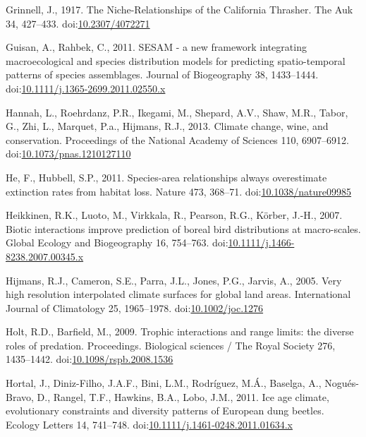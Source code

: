 \hypertarget{ref-Grinnell1917a}{}
Grinnell, J., 1917. The Niche-Relationships of the California Thrasher.
The Auk 34, 427--433.
doi:\href{https://doi.org/10.2307/4072271}{10.2307/4072271}

\hypertarget{ref-Guisan2011}{}
Guisan, A., Rahbek, C., 2011. SESAM - a new framework integrating
macroecological and species distribution models for predicting
spatio-temporal patterns of species assemblages. Journal of Biogeography
38, 1433--1444.
doi:\href{https://doi.org/10.1111/j.1365-2699.2011.02550.x}{10.1111/j.1365-2699.2011.02550.x}

\hypertarget{ref-Hannah2013}{}
Hannah, L., Roehrdanz, P.R., Ikegami, M., Shepard, A.V., Shaw, M.R.,
Tabor, G., Zhi, L., Marquet, P.a., Hijmans, R.J., 2013. Climate change,
wine, and conservation. Proceedings of the National Academy of Sciences
110, 6907--6912.
doi:\href{https://doi.org/10.1073/pnas.1210127110}{10.1073/pnas.1210127110}

\hypertarget{ref-He2011}{}
He, F., Hubbell, S.P., 2011. Species-area relationships always
overestimate extinction rates from habitat loss. Nature 473, 368--71.
doi:\href{https://doi.org/10.1038/nature09985}{10.1038/nature09985}

\hypertarget{ref-Heikkinen2007}{}
Heikkinen, R.K., Luoto, M., Virkkala, R., Pearson, R.G., Körber, J.-H.,
2007. Biotic interactions improve prediction of boreal bird
distributions at macro-scales. Global Ecology and Biogeography 16,
754--763.
doi:\href{https://doi.org/10.1111/j.1466-8238.2007.00345.x}{10.1111/j.1466-8238.2007.00345.x}

\hypertarget{ref-Hijmans2005}{}
Hijmans, R.J., Cameron, S.E., Parra, J.L., Jones, P.G., Jarvis, A.,
2005. Very high resolution interpolated climate surfaces for global land
areas. International Journal of Climatology 25, 1965--1978.
doi:\href{https://doi.org/10.1002/joc.1276}{10.1002/joc.1276}

\hypertarget{ref-Holt2009}{}
Holt, R.D., Barfield, M., 2009. Trophic interactions and range limits:
the diverse roles of predation. Proceedings. Biological sciences / The
Royal Society 276, 1435--1442.
doi:\href{https://doi.org/10.1098/rspb.2008.1536}{10.1098/rspb.2008.1536}

\hypertarget{ref-Hortal2011}{}
Hortal, J., Diniz-Filho, J.A.F., Bini, L.M., Rodríguez, M.Á., Baselga,
A., Nogués-Bravo, D., Rangel, T.F., Hawkins, B.A., Lobo, J.M., 2011. Ice
age climate, evolutionary constraints and diversity patterns of European
dung beetles. Ecology Letters 14, 741--748.
doi:\href{https://doi.org/10.1111/j.1461-0248.2011.01634.x}{10.1111/j.1461-0248.2011.01634.x}

